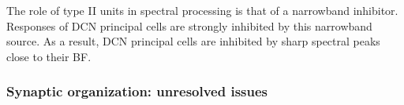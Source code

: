 The role of type II units in spectral processing is that of a
narrowband inhibitor. Responses of DCN principal cells are strongly
inhibited by this narrowband source. As a result, DCN principal cells
are inhibited by sharp spectral peaks close to their BF.


\subsubsection{Synaptic organization: unresolved issues}


